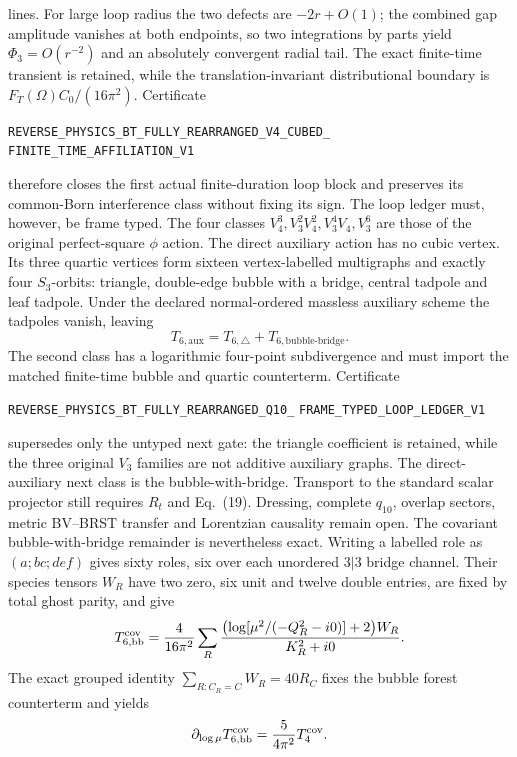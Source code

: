 \documentclass[11pt]{article}
\theoremstyle{definition}
\theoremstyle{remark}
\begin{document}
lines.  For large loop radius the two defects are $-2r+O(1)$; the combined
gap amplitude vanishes at both endpoints, so two integrations by parts yield
$\Phi_3=O(r^{-2})$ and an absolutely convergent radial tail.  The exact
finite-time transient is retained, while the translation-invariant
distributional boundary is $F_T(\Omega)C_0/(16\pi^2)$.  Certificate
\par\noindent
\texttt{REVERSE\_PHYSICS\_BT\_FULLY\_REARRANGED\_V4\_CUBED\_}
\allowbreak\texttt{FINITE\_TIME\_AFFILIATION\_V1}
\par\noindent
therefore closes the first actual finite-duration loop block and preserves
its common-Born interference class without fixing its sign.  The loop ledger
must, however, be frame typed.  The four classes
$V_4^3,V_3^2V_4^2,V_3^4V_4,V_3^6$ are those of the original
perfect-square $\phi$ action.  The direct auxiliary action has no cubic
vertex.  Its three quartic vertices form sixteen vertex-labelled multigraphs
and exactly four $S_3$-orbits: triangle, double-edge bubble with a bridge,
central tadpole and leaf tadpole.  Under the declared normal-ordered massless
auxiliary scheme the tadpoles vanish, leaving
\[
 T_{6,\mathrm{aux}}=T_{6,\triangle}
 +T_{6,\mathrm{bubble\mbox{-}bridge}}.
\]
The second class has a logarithmic four-point subdivergence and must import
the matched finite-time bubble and quartic counterterm.  Certificate
\par\noindent
\texttt{REVERSE\_PHYSICS\_BT\_FULLY\_REARRANGED\_Q10\_}
\allowbreak\texttt{FRAME\_TYPED\_LOOP\_LEDGER\_V1}
\par\noindent
supersedes only the untyped next gate: the triangle coefficient is retained,
while the three original $V_3$ families are not additive auxiliary graphs.
The direct-auxiliary next class is the bubble-with-bridge.  Transport to the
standard scalar projector still requires $R_t$ and Eq.~(19).  Dressing,
complete $q_{10}$, overlap sectors, metric BV--BRST transfer and Lorentzian
causality remain open.
The covariant bubble-with-bridge remainder is nevertheless exact.  Writing a
labelled role as $(a;bc;def)$ gives sixty roles, six over each unordered
$3|3$ bridge channel.  Their species tensors $W_R$ have two zero, six unit
and twelve double entries, are fixed by total ghost parity, and give
\[
 T_{6,\mathrm{bb}}^{\mathrm{cov}}
 ={4\over16\pi^2}\sum_R
 {\bigl(\log[\mu^2/(-Q_R^2-i0)]+2\bigr)W_R
  \over K_R^2+i0}.
\]
The exact grouped identity $\sum_{R:C_R=C}W_R=40R_C$ fixes the bubble forest
counterterm and yields
\[
 \partial_{\log\mu}T_{6,\mathrm{bb}}^{\mathrm{cov}}
 ={5\over4\pi^2}T_4^{\mathrm{cov}}.
\]
\end{document}
